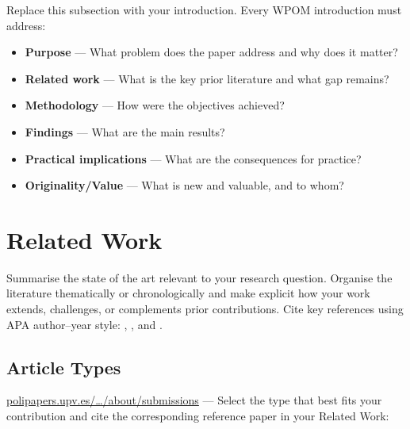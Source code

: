 \documentclass{wpom-upv}
\begin{document}
Replace this subsection with your introduction.
Every WPOM introduction must address:

\begin{itemize}
  \item \textbf{Purpose} — What problem does the paper address and why does it matter?
  \item \textbf{Related work} — What is the key prior literature and what gap remains?
  \item \textbf{Methodology} — How were the objectives achieved?
  \item \textbf{Findings} — What are the main results?
  \item \textbf{Practical implications} — What are the consequences for practice?
  \item \textbf{Originality/Value} — What is new and valuable, and to whom?
\end{itemize}



\section{Related Work}


Summarise the state of the art relevant to your research question.
Organise the literature thematically or chronologically and make
explicit how your work extends, challenges, or complements prior
contributions.
Cite key references using APA author--year style:
\parencite{maringarcia2021three}, \textcite{maringarcia2022case}, and
\textcite{maringarcia2021teaching}.

\subsection{Article Types}

\href{https://polipapers.upv.es/index.php/WPOM/about/submissions}{polipapers.upv.es/…/about/submissions}
— Select the type that best fits your contribution and cite the
corresponding reference paper in your Related Work:
\end{document}
